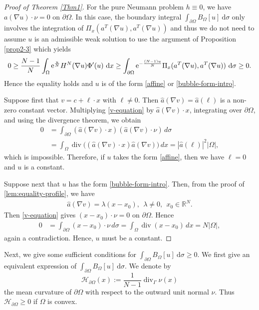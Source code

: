 \documentclass[reqno, 11pt]{amsart} %
\numberwithin{equation}{section}
\theoremstyle{definition}
\newcommand{\pa}{\partial}
\newcommand{\R}{\mathbb{R}}
\newcommand{\e}{\textup{e}}
\newcommand{\dx}{\textup{d}x}
\begin{document}
\begin{proof}[Proof of Theorem \ref{Thm1}]
For the pure Neumann problem $h\equiv0$, we have $a(\nabla u) \cdot \nu =0$ on $\pa \Omega$. In this case, the boundary integral $\int_{\pa \Omega} B_{\Omega}[u] \ \text{d} \sigma$ only involves the integration of $\Pi_x(a^T(\nabla u), a^T(\nabla u))$ and thus we do not need to assume $u$ is an admissible weak solution to use the argument of Proposition \ref{prop2-3} which yields
\[
       0 \geq \frac{N-1}{N} \int_{\Omega} \e^{\frac{u}{N}} H^N(\nabla u) \Phi'(u) \ \dx \geq \int_{\pa \Omega} \e^{-\frac{(N-1)u}{N}} \Pi_x(a^T(\nabla u), a^T(\nabla u)) \ \text{d} \sigma \geq 0.
\]
Hence the equality  holds and $u$ is of the form \eqref{affine} or \eqref{bubble-form-intro}.
 
 Suppose first that $v=c+\ell\cdot x$ with $\ell\ne0$. Then $\widehat{a}(\nabla v) = \widehat a(\ell)$ is a non-zero constant vector. 
 Multiplying \eqref{v-equation} by $\hat{a}(\nabla v) \cdot x$, integrating over $\partial\Omega$, and using the divergence theorem, we obtain
\begin{align*}
    0&=\int_{\partial\Omega}( \hat{a}(\nabla v)  \cdot x)(\hat{a}(\nabla v)  \cdot \nu)\,d\sigma\\
    &=\int_\Omega\operatorname{div}\bigl((\hat{a}(\nabla v) \cdot x) \hat{a}(\nabla v)  \bigr)\,dx =|\hat{a}(\ell) |^2|\Omega|,
\end{align*}
which is impossible. Therefore, if $u$ takes the form \eqref{affine}, then we have $\ell =0$ and $u$ is a constant.

Suppose next that $u$ has the form \eqref{bubble-form-intro}. Then, from the proof of \eqref{lem:equality-profile}, we have
\begin{align*}
       \hat{a}(\nabla v)  =\lambda (x - x_0),\ \ \lambda\ne0, \ \ x_0 \in \R^N.
\end{align*}
Then \eqref{v-equation} gives $(x-x_0)\cdot\nu=0$ on $\partial\Omega$.  Hence
\begin{align*}
0&=\int_{\partial\Omega}(x-x_0)\cdot\nu\,d\sigma
 =\int_\Omega\operatorname{div}(x-x_0)\,dx
 =N|\Omega|,
\end{align*}
again a contradiction. Hence, $u$ must be a constant.
\end{proof}


Next, we give some sufficient conditions for $\int_{\pa \Omega} B_{\Omega}[u] \ \text{d}\sigma \geq 0$. We first give an equivalent expression of $\int_{\pa \Omega} B_{\Omega} [u] \ \text{d} \sigma$.  We denote by
\[
    \mathcal{H}_{\pa \Omega}(x):=\frac{1}{N-1}\operatorname{div}_\Gamma\nu(x)
\]
the mean curvature of $\partial\Omega$ with respect to the
outward unit normal $\nu$. Thus $\mathcal{H}_{\pa \Omega} \geq0$ if $\Omega$ is convex.
\end{document}
